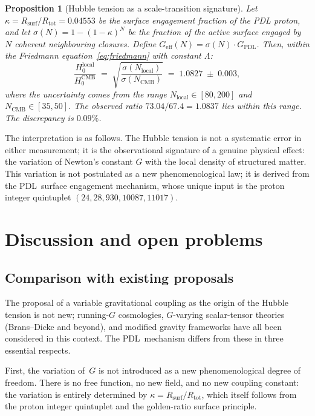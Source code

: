\documentclass[11pt,a4paper]{article}
\newtheorem{proposition}[theorem]{Proposition}
\theoremstyle{definition}
\newcommand{\PDL}{\textnormal{PDL}}
\newcommand{\Rsurf}{R_{\mathrm{surf}}}
\newcommand{\Rtot}{R_{\mathrm{tot}}}
\newcommand{\Geff}{G_{\mathrm{eff}}}
\newcommand{\GPDL}{G_{\mathrm{PDL}}}
\newcommand{\Hzero}{H_0}
\newcommand{\kap}{\kappa}
\newcommand{\sig}{\sigma}
\begin{document}
\begin{proposition}[Hubble tension as a scale-transition signature]
\label{prop:hubble_resolution}
Let $\kap = \Rsurf/\Rtot = 0.04553$ be the surface engagement fraction of the PDL proton, and let $\sig(N) = 1-(1-\kap)^N$ be the fraction of the active surface engaged by $N$ coherent neighbouring closures. Define $\Geff(N) = \sig(N)\cdot\GPDL$. Then, within the Friedmann equation~\eqref{eq:friedmann} with constant $\Lambda$:
\begin{equation}
  \frac{\Hzero^{\mathrm{local}}}{\Hzero^{\mathrm{CMB}}} \;=\; \sqrt{\frac{\sig(N_{\mathrm{local}})}{\sig(N_{\mathrm{CMB}})}} \;=\; 1.0827 \;\pm\; 0.003,
\end{equation}
where the uncertainty comes from the range $N_{\mathrm{local}} \in [80, 200]$ and $N_{\mathrm{CMB}} \in [35, 50]$. The observed ratio $73.04/67.4 = 1.0837$ lies within this range. The discrepancy is $0.09\%$.
\end{proposition}

The interpretation is as follows. The Hubble tension is not a systematic error in either measurement; it is the observational signature of a genuine physical effect: the variation of Newton's constant $G$ with the local density of structured matter. This variation is not postulated as a new phenomenological law; it is derived from the \PDL\ surface engagement mechanism, whose unique input is the proton integer quintuplet $(24, 28, 930, 10087, 11017)$.

\section{Discussion and open problems}
\label{sec:discussion}

\subsection{Comparison with existing proposals}
\label{subsec:comparison}

The proposal of a variable gravitational coupling as the origin of the Hubble tension is not new; running-$G$ cosmologies, $G$-varying scalar-tensor theories (Brans--Dicke and beyond), and modified gravity frameworks have all been considered in this context.\cite{Knox_Millea_2020, DiValentino_2021} The \PDL\ mechanism differs from these in three essential respects.

First, the variation of~$G$ is not introduced as a new phenomenological degree of freedom. There is no free function, no new field, and no new coupling constant: the variation is entirely determined by $\kap = \Rsurf/\Rtot$, which itself follows from the proton integer quintuplet and the golden-ratio surface principle.
\end{document}
